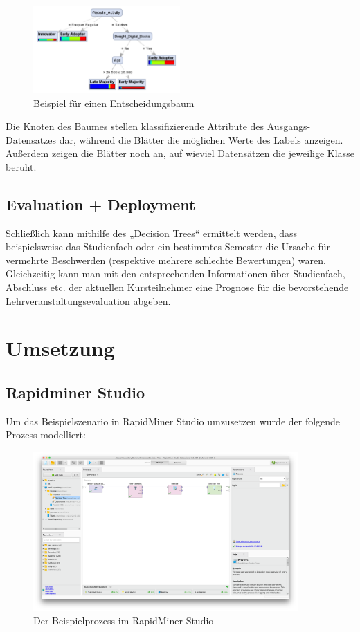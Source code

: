 \begin{figure}[htb]
  \center
	\includegraphics[width=0.5\textwidth]{gfx/dt.png}
	\caption{Beispiel für einen Entscheidungsbaum \cite{North:2012}}
	\label{fig:example:data:mod:dt}
\end{figure}

Die Knoten des Baumes stellen klassifizierende Attribute des Ausgangs-Datensatzes
dar, während die Blätter die möglichen Werte des Labels anzeigen. Außerdem
zeigen die Blätter noch an, auf wieviel Datensätzen die jeweilige Klasse beruht.

\subsection{Evaluation + Deployment}
\label{sec:example:data:eval}

Schließlich kann mithilfe des „Decision Trees“ ermittelt werden, dass
beispielsweise das Studienfach oder ein bestimmtes Semester die Ursache für
vermehrte Beschwerden (respektive mehrere schlechte Bewertungen) waren.
Gleichzeitig kann man mit den entsprechenden Informationen über Studienfach,
Abschluss etc. der aktuellen Kursteilnehmer eine Prognose für die bevorstehende
Lehrveranstaltungsevaluation abgeben.

\section{Umsetzung}
\label{sec:example:impl}

\subsection{Rapidminer Studio}
\label{sec:example:impl:rm}

Um das Beispielszenario in RapidMiner Studio umzusetzen wurde der folgende
Prozess modelliert:

\begin{figure}[htb]
  \center
	\includegraphics[width=0.9\textwidth]{gfx/rmproc.png}
	\caption{Der Beispielprozess im RapidMiner Studio}
	\label{fig:example:impl:rm:proc}
\end{figure}

